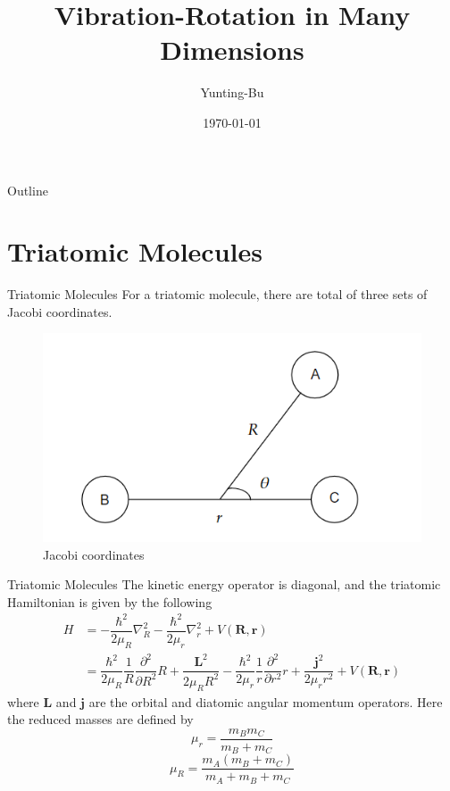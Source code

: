 \documentclass{beamer}
\title{Vibration-Rotation in Many Dimensions}
\author{Yunting-Bu}
\date{\today}
\begin{document}
	\begin{frame}
		\titlepage 
	\end{frame}
	
	\logo{}
	\begin{frame}{Outline}
		\tableofcontents
	\end{frame}
	\section{Triatomic Molecules}
	\begin{frame}{Triatomic Molecules}
		For a triatomic molecule, there are total of three sets of Jacobi coordinates.
		\begin{figure}[H]
			\centering
			\includegraphics[scale=0.5]{1.png}
			\caption{Jacobi coordinates}
			\label{Figure1}
		\end{figure}
	\end{frame}
	\begin{frame}{Triatomic Molecules}
		The kinetic energy operator is diagonal, and the triatomic Hamiltonian is given by the following
		\begin{align}
			H&=-\dfrac{\hbar^2}{2\mu_R}\nabla^2_R-\dfrac{\hbar^2}{2\mu_r}\nabla^2_r+V(\mathbf{R},\mathbf{r})\nonumber\\
			&=\dfrac{\hbar^2}{2\mu_R}\dfrac{1}{R}\dfrac{\partial^2}{\partial R^2}R+\dfrac{\mathbf{L}^2}{2\mu_RR^2}-\dfrac{\hbar^2}{2\mu_r}\dfrac{1}{r}\dfrac{\partial^2}{\partial r^2}r+\dfrac{\mathbf{j}^2}{2\mu_rr^2}+V(\mathbf{R},\mathbf{r})
		\end{align}
		where $\mathbf{L}$ and $\mathbf{j}$ are the orbital and diatomic angular momentum operators. Here the reduced masses are defined by
		\begin{equation}
			\mu_r=\dfrac{m_Bm_C}{m_B+m_C}
		\end{equation}
		\begin{equation}
			\mu_R=\dfrac{m_A(m_B+m_C)}{m_A+m_B+m_C}
		\end{equation}
	\end{frame}
\end{document}
